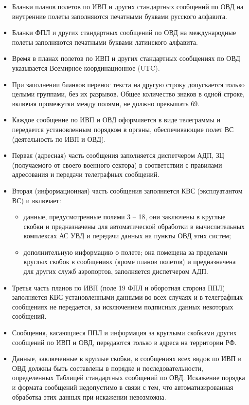 \begin{itemize}
    \item Бланки планов полетов по ИВП и других стандартных сообщений по ОВД на внутренние полеты заполняются печатными буквами русского алфавита.
    \item  Бланки ФПЛ и других стандартных сообщений по ОВД на международные полеты заполняются печатными буквами латинского алфавита.
    \item Время в планах полетов по ИВП и других стандартных сообщениях по ОВД указывается Всемирное координационное (UTC).
    \item При заполнении бланков перенос текста на другую строку допускается только целыми группами, без их разрывов. Общее количество знаков в одной строке, включая промежутки между полями, не должно превышать 69.
    \item Каждое сообщение по ИВП и ОВД оформляется в виде телеграммы и передается установленным порядком в органы, обеспечивающие полет ВС (деятельность по ИВП и ОВД).
    \item Первая (адресная) часть сообщения заполняется диспетчером АДП, ЗЦ (получаемого от своего военного сектора) в соответствии с правилами адресования и передачи телеграфных сообщений.
    \item Вторая (информационная) часть сообщения заполняется КВС (эксплуатантом ВС) и включает:
    \begin{itemize}
        \item данные, предусмотренные полями 3 – 18, они заключены в круглые скобки и предназначены для автоматической обработки в вычислительных комплексах АС УВД и передачи данных на пункты ОВД этих систем;
        \item дополнительную информацию о полете; она помещена за пределами круглых скобок в сообщениях (кроме планов полетов) и предназначена для других служб аэропортов, заполняется диспетчером АДП.
    \end{itemize}
    \item Третья часть планов по ИВП (поле 19 ФПЛ и оборотная сторона ППЛ) заполняется КВС установленными данными во всех случаях и в телеграфных сообщениях не передается, за исключением подписных данных некоторых сообщений.
    \item Сообщения, касающиеся ППЛ и информация за круглыми скобками других сообщений по ИВП и ОВД, передаются только в адреса на территории РФ.
    \item Данные, заключенные в круглые скобки, в сообщениях всех видов по ИВП и ОВД должны быть составлены в порядке и последовательности, определенных Таблицей стандартных сообщений по ОВД. Искажение порядка и формата сообщений недопустимо в связи с тем, что автоматизированная обработка этих данных при искажении невозможна.
\end{itemize}
	
